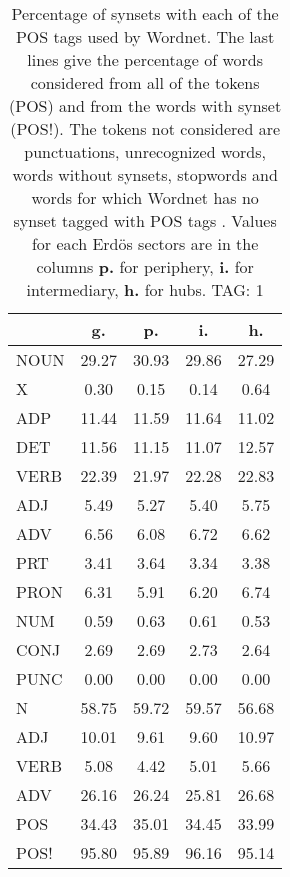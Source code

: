 \begin{table}[h!]
\begin{center}
\begin{tabular}{| l || c | c | c | c |}\hline
 & {\bf g.} & {\bf p.} & {\bf i.} & {\bf h.} \\\hline\hline
NOUN & 29.27  & 30.93  & 29.86  & 27.29 \\
X & 0.30  & 0.15  & 0.14  & 0.64 \\\hline
ADP & 11.44  & 11.59  & 11.64  & 11.02 \\
DET & 11.56  & 11.15  & 11.07  & 12.57 \\\hline
VERB & 22.39  & 21.97  & 22.28  & 22.83 \\\hline
ADJ & 5.49  & 5.27  & 5.40  & 5.75 \\
ADV & 6.56  & 6.08  & 6.72  & 6.62 \\\hline
PRT & 3.41  & 3.64  & 3.34  & 3.38 \\
PRON & 6.31  & 5.91  & 6.20  & 6.74 \\
NUM & 0.59  & 0.63  & 0.61  & 0.53 \\
CONJ & 2.69  & 2.69  & 2.73  & 2.64 \\
PUNC & 0.00  & 0.00  & 0.00  & 0.00 \\\hline\hline\hline
N & 58.75  & 59.72  & 59.57  & 56.68 \\\hline
ADJ & 10.01  & 9.61  & 9.60  & 10.97 \\\hline
VERB & 5.08  & 4.42  & 5.01  & 5.66 \\\hline
ADV & 26.16  & 26.24  & 25.81  & 26.68 \\\hline\hline
POS & 34.43  & 35.01  & 34.45  & 33.99 \\\hline
POS! & 95.80  & 95.89  & 96.16  & 95.14 \\\hline
\end{tabular}
\caption{Percentage of synsets with each of the POS tags used by Wordnet. The last lines give the percentage of words considered from all of the tokens (POS) and from the words with synset (POS!). The tokens not considered are punctuations, unrecognized words, words without synsets, stopwords and words for which Wordnet has no synset  tagged with POS tags . Values for each Erd\"os sectors are in the columns {{\bf p.}} for periphery, {{\bf i.}} for intermediary, {{\bf h.}} for hubs. TAG: 1}
\end{center}
\end{table}